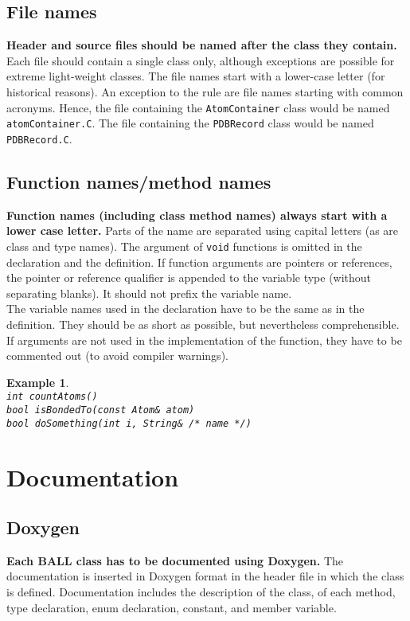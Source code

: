 \documentclass[a4paper,10pt]{article}
\newtheorem{example}{Example}
\begin{document}
\subsection{File names}

{\bf Header and source files should be named after the class they contain.}
Each file should contain a single class only, although exceptions are possible
for extreme light-weight classes. The file names start with a lower-case
letter (for historical reasons). An exception to the rule are file names starting 
with common acronyms. Hence, the file containing the {\tt AtomContainer} class 
would be named {\tt atomContainer.C}. The file containing the {\tt PDBRecord} class
would be named {\tt PDBRecord.C}.

\subsection{Function names/method names}

{\bf Function names (including class method names) always start with a lower case
letter.} Parts of the name are separated using capital letters (as are class
and type names). The argument of {\tt void} functions is omitted in
the declaration and the definition. If function arguments are pointers or
references, the pointer or reference qualifier is appended to the variable
type (without separating blanks). It should not prefix the variable name.\\
The variable names used in the declaration have to be the same as in the
definition. They should be as short as possible, but nevertheless
comprehensible.  If arguments are not used in the implementation of the
function, they have to be commented out (to avoid compiler warnings).
\begin{example}\hspace*{2mm}\\
{\tt int countAtoms()}\\
{\tt bool isBondedTo(const Atom\& atom)}\\
{\tt bool doSomething(int i, String\& /* name */)}
\end{example}

\section{Documentation}

\subsection{Doxygen}
{\bf Each BALL class has to be documented using Doxygen.} The documentation is
inserted in Doxygen format in the header file in which the class is defined.
Documentation includes the description of the class, of each method, type
declaration, enum declaration, constant, and member variable.
\end{document}
